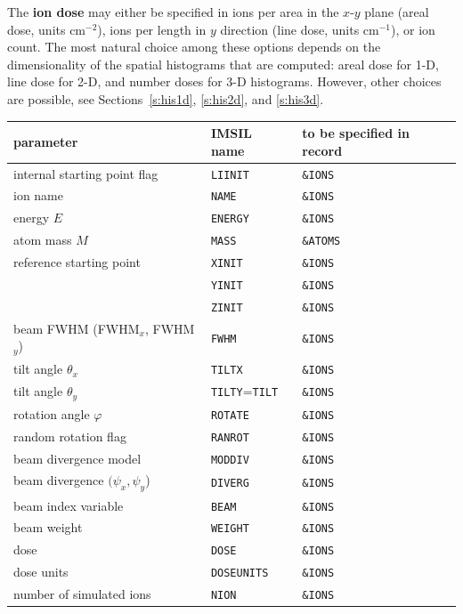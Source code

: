 The \textbf{ion dose} may either be specified in ions per area in the $x$-$y$
plane (areal dose, units cm$^{-2}$), ions per length in $y$ direction (line
dose, units cm$^{-1}$), or ion count. The most natural choice among these
options depends on the dimensionality of the spatial histograms that are
computed: areal dose for 1-D, line dose for 2-D, and number doses for 3-D
histograms. However, other choices are possible, see Sections~\ref{s:his1d},
\ref{s:his2d}, and \ref{s:his3d}.

\begin{center}
\begin{tabular}{lll}
parameter \quad                   & IMSIL name & to be specified in record \\
\hline
internal starting point flag      & \texttt{LIINIT}    & \texttt{\&IONS} \\
ion name                          & \texttt{NAME}      & \texttt{\&IONS} \\
energy $E$                        & \texttt{ENERGY}    & \texttt{\&IONS} \\
atom mass $M$                     & \texttt{MASS}      & \texttt{\&ATOMS} \\
reference starting point          & \texttt{XINIT}     & \texttt{\&IONS} \\
                                  & \texttt{YINIT}     & \texttt{\&IONS} \\
                                  & \texttt{ZINIT}     & \texttt{\&IONS} \\
beam FWHM (FWHM$_x$, FWHM$_y$)    & \texttt{FWHM}      & \texttt{\&IONS} \\
tilt angle $\theta_x$             & \texttt{TILTX}     & \texttt{\&IONS} \\
tilt angle $\theta_y$   & \texttt{TILTY}=\texttt{TILT} & \texttt{\&IONS} \\
rotation angle $\varphi$          & \texttt{ROTATE}    & \texttt{\&IONS} \\
random rotation flag              & \texttt{RANROT}    & \texttt{\&IONS} \\
beam divergence model             & \texttt{MODDIV}    & \texttt{\&IONS} \\
beam divergence $(\psi_x,\psi_y$) & \texttt{DIVERG}    & \texttt{\&IONS} \\
beam index variable               & \texttt{BEAM}      & \texttt{\&IONS} \\
beam weight                       & \texttt{WEIGHT}    & \texttt{\&IONS} \\
dose                              & \texttt{DOSE}      & \texttt{\&IONS} \\
dose units                        & \texttt{DOSEUNITS} & \texttt{\&IONS} \\
number of simulated ions          & \texttt{NION}      & \texttt{\&IONS} \\
\end{tabular}
\end{center}
